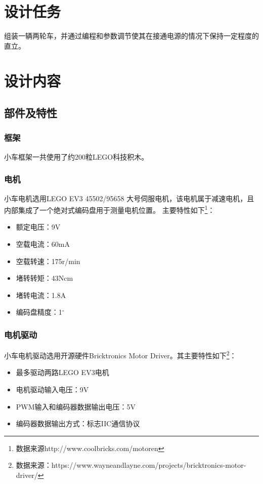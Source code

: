 \documentclass[a4paper]{ctexart}
\begin{document}
\begin{spacing}{1.5}%
\songti{}
\section{设计任务}
组装一辆两轮车，并通过编程和参数调节使其在接通电源的情况下保持一定程度的直立。
\section{设计内容}
\subsection{部件及特性}
\subsubsection{框架}
小车框架一共使用了约200粒LEGO科技积木。
\subsubsection{电机}
小车电机选用LEGO EV3 45502/95658 大号伺服电机，该电机属于减速电机，且内部集成了一个绝对式编码盘用于测量电机位置。
主要特性如下\footnote{数据来源http://www.coolbricks.com/motoren}：
\begin{itemize}
	\item 额定电压：9V
	\item 空载电流：60mA
	\item 空载转速：175r/min
	\item 堵转转矩：43Ncm
	\item 堵转电流：1.8A
	\item 编码盘精度：1$^\circ$
\end{itemize}
\subsubsection{电机驱动}
小车电机驱动选用开源硬件Bricktronics Motor Driver。其主要特性如下\footnote{数据来源：https://www.wayneandlayne.com/projects/bricktronics-motor-driver/}：
\begin{itemize}
	\item 最多驱动两路LEGO EV3电机
	\item 电机驱动输入电压：9V
	\item PWM输入和编码器数据输出电压：5V
	\item 编码器数据输出方式：标志IIC通信协议
\end{itemize}

\end{spacing}
\end{document}
